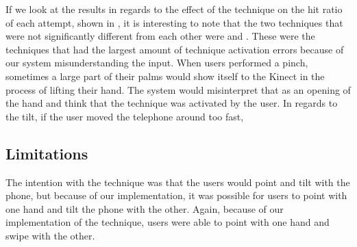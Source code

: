 If we look at the results in regards to the effect of the technique on the hit ratio of each attempt, shown in , it is interesting to note that the two techniques that were not significantly different from each other were \tilt and \pinch. These were the techniques that had the largest amount of technique activation errors because of our system misunderstanding the input. When users performed a pinch, sometimes a large part of their palms would show itself to the Kinect in the process of lifting their hand. The system would misinterpret that as an opening of the hand and think that the technique was activated by the user. In regards to the tilt, if the user moved the telephone around too fast,    

\subsection{Limitations}

The intention with the \tilt technique was that the users would point and tilt with the phone, but because of our implementation, it was possible for users to point with one hand and tilt the phone with the other.
Again, because of our implementation of the \swipe technique, users were able to point with one hand and swipe with the other.